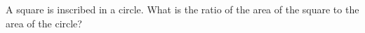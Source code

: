 A square is inscribed in a circle. What is the ratio of the area of the square to the area of the circle?
